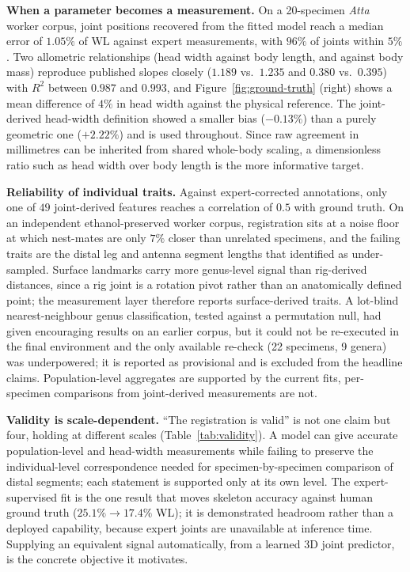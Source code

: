 \textbf{When a parameter becomes a measurement.} On a 20-specimen \emph{Atta}
worker corpus, joint positions recovered from the fitted model reach a median
error of $1.05\%$ of WL against expert measurements, with $96\%$ of joints
within $5\%$. Two allometric relationships (head width against body length, and
against body mass) reproduce published slopes closely ($1.189$ vs.\ $1.235$ and
$0.380$ vs.\ $0.395$) with $R^2$ between $0.987$ and $0.993$, and
Figure~\ref{fig:ground-truth} (right) shows a mean difference of $4\%$ in head width
against the physical reference. The joint-derived head-width definition showed a
smaller bias ($-0.13\%$) than a purely geometric one ($+2.22\%$) and is used
throughout. Since raw agreement in millimetres can be inherited from shared
whole-body scaling, a dimensionless ratio such as head width over body length
is the more informative target.

\textbf{Reliability of individual traits.}
\label{sec:reliability}
Against expert-corrected annotations, only one of $49$ joint-derived features
reaches a correlation of $0.5$ with ground truth. On an independent
ethanol-preserved worker corpus, registration sits at a noise floor at which
nest-mates are only $7\%$ closer than unrelated specimens, and the failing
traits are the distal leg and antenna segment lengths that  identified as
under-sampled. Surface landmarks carry more genus-level signal than rig-derived
distances, since a rig joint is a rotation pivot rather than an anatomically
defined point; the measurement layer therefore reports surface-derived traits.
A lot-blind nearest-neighbour genus classification, tested against a permutation
null, had given encouraging results on an earlier corpus, but it could not be
re-executed in the final environment and the only available re-check (22
specimens, 9 genera) was underpowered; it is reported as provisional and is
excluded from the headline claims. Population-level aggregates are supported by
the current fits, per-specimen comparisons from joint-derived measurements are
not.

\textbf{Validity is scale-dependent.} ``The registration is valid'' is not one
claim but four, holding at different scales (Table~\ref{tab:validity}). A model
can give accurate population-level and head-width measurements while failing
to preserve the individual-level correspondence needed for specimen-by-specimen
comparison of distal segments; each statement is supported only at its own
level. The expert-supervised fit is the one result that moves skeleton accuracy
against human ground truth ($25.1\%\to17.4\%$ WL); it is demonstrated headroom
rather than a deployed capability, because expert joints are unavailable at
inference time. Supplying an equivalent signal automatically, from a learned 3D
joint predictor, is the concrete objective it motivates.

